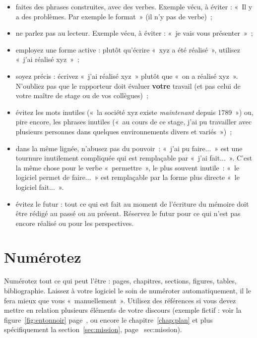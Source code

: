 \documentclass [twoside,openright,a4paper,11pt,french] {report}
\begin{document}
\begin {itemize}
    \item faites des phrases construites, avec des verbes. Exemple vécu,
	à éviter : «~Il y a des problèmes. Par exemple le
	format~» (il n'y pas de verbe)~;

    \item ne parlez pas au lecteur. Exemple vécu, à éviter : «~je vais
	vous présenter~»~;

    \item employez une forme active : plutôt qu'écrire «~xyz a été
	réalisé~», utilisez «~j'ai réalisé xyz~»~;

    \item soyez précis : écrivez «~j'ai réalisé xyz~» plutôt que «~on a
	réalisé xyz~». N'oubliez pas que le rapporteur doit évaluer
	\textbf{votre} travail (et pas celui de votre maître de stage ou
	de vos collègues)~;

    \item évitez les mots inutiles («~la société xyz existe
	\emph{maintenant} depuis 1789~») ou, pire encore, les phrases
	inutiles («~au cours de ce stage, j'ai pu travailler avec
	plusieurs personnes dans quelques environnements divers et
	variés~»)~;

    \item dans la même lignée, n'abusez pas du pouvoir~: «~j'ai pu
	faire...~» est une tournure inutilement compliquée qui est
	remplaçable par «~j'ai fait...~». C'est la même chose pour le
	verbe «~permettre~», le plus souvent inutile~: «~le logiciel
	permet de faire...~» est remplaçable par la forme plus directe
	«~le logiciel fait...~».

    \item évitez le futur : tout ce qui est fait au moment de l'écriture
	du mémoire doit être rédigé au passé ou au
	présent. Réservez le futur pour ce qui n'est pas encore
	réalisé ou pour les perspectives.

\end {itemize}


\section {Numérotez}

Numérotez tout ce qui peut l'être : pages, chapitres, sections, figures,
tables, bibliographie. Laissez à votre logiciel le soin de numéroter
automatiquement, il le fera mieux que vous «~manuellement~». Utilisez
des références si vous devez mettre en relation plusieurs éléments
de votre discours (exemple fictif : voir la figure~\ref {fig:entonnoir}
page~\pageref {fig:entonnoir}, ou encore le chapitre~\ref {chap:plan}
et plus spécifiquement la section~\ref {sec:mission}, page~\pageref
{sec:mission}).
\end{document}
